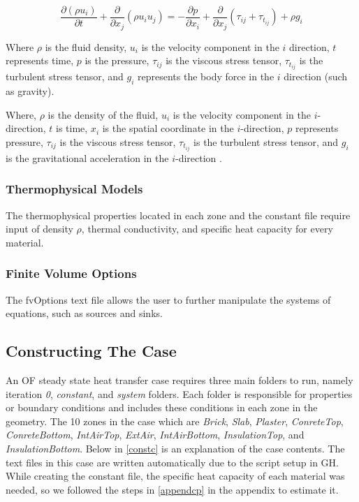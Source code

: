 \begin{equation}
\frac{\partial (\rho u_i)}{\partial t} + \frac{\partial}{\partial x_j} \left( \rho u_i u_j \right) = -\frac{\partial p}{\partial x_i} + \frac{\partial}{\partial x_j} \left( \tau_{ij} + \tau_{t_{ij}} \right) + \rho g_i
\end{equation}

Where \(\rho\) is the fluid density, \(u_i\) is the velocity component in the \(i\) direction, \(t\) represents time, \(p\) is the pressure, \(\tau_{ij}\) is the viscous stress tensor, \(\tau_{t_{ij}}\) is the turbulent stress tensor, and \(g_i\) represents the body force in the \(i\) direction (such as gravity).


Where, $\rho$ is the density of the fluid, $u_i$ is the velocity component in the $i$-direction, $t$ is time, $x_i$ is the spatial coordinate in the $i$-direction, $p$ represents pressure, $\tau_{ij}$ is the viscous stress tensor, $\tau_{t_{ij}}$ is the turbulent stress tensor, and $g_i$ is the gravitational acceleration in the $i$-direction
 \cite{cht}.


\subsubsection{Thermophysical Models}
The thermophysical properties located in each zone and the constant file require input of density $\rho$, thermal conductivity, and specific heat capacity for every material.
\subsubsection{Finite Volume Options}
The fvOptions text file allows the user to further manipulate the systems of equations, such as sources and sinks.  


\subsection{Constructing The Case}    
An \gls{OF} steady state heat transfer case requires three main folders to run, namely iteration \textit{0}, \textit{constant}, and \textit{system} folders. Each folder is responsible for properties or boundary conditions and includes these conditions in each zone in the geometry. The 10 zones in the case which are \textit{Brick}, \textit{Slab}, \textit{Plaster}, \textit{ConreteTop}, \textit{ConreteBottom}, \textit{IntAirTop}, \textit{ExtAir}, \textit{IntAirBottom}, \textit{InsulationTop}, and \textit{InsulationBottom}. Below in \cref{constc} is an explanation of the case contents. The text files in this case are written automatically due to the script setup in \gls{GH}. While creating the constant file, the specific heat capacity of each material was needed, so we followed the steps in \ref{appendcp} in the appendix to estimate it.






